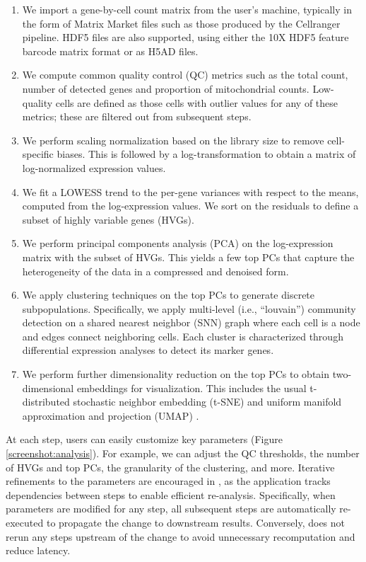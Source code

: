 \documentclass{article}
\begin{document}
\begin{enumerate}
\item We import a gene-by-cell count matrix from the user's machine, typically in the form of Matrix Market files such as those produced by the Cellranger pipeline.
HDF5 files are also supported, using either the 10X HDF5 feature barcode matrix format or as H5AD files.
\item We compute common quality control (QC) metrics such as the total count, number of detected genes and proportion of mitochondrial counts.
Low-quality cells are defined as those cells with outlier values for any of these metrics; these are filtered out from subsequent steps.
\item We perform scaling normalization based on the library size to remove cell-specific biases.
This is followed by a log-transformation to obtain a matrix of log-normalized expression values.
\item We fit a LOWESS trend \cite{cleveland1979robust} to the per-gene variances with respect to the means, computed from the log-expression values.
We sort on the residuals to define a subset of highly variable genes (HVGs). 
\item We perform principal components analysis (PCA) on the log-expression matrix with the subset of HVGs.
This yields a few top PCs that capture the heterogeneity of the data in a compressed and denoised form.
\item We apply clustering techniques on the top PCs to generate discrete subpopulations.
Specifically, we apply multi-level (i.e., ``louvain'') community detection on a shared nearest neighbor (SNN) graph where each cell is a node and edges connect neighboring cells.
Each cluster is characterized through differential expression analyses to detect its marker genes.
\item We perform further dimensionality reduction on the top PCs to obtain two-dimensional embeddings for visualization. 
This includes the usual t-distributed stochastic neighbor embedding (t-SNE) and uniform manifold approximation and projection (UMAP) \cite{maaten2014accelerating,mcinnes2018umap}.
\end{enumerate}

At each step, users can easily customize key parameters (Figure \ref{screenshot:analysis}).
For example, we can adjust the QC thresholds, the number of HVGs and top PCs, the granularity of the clustering, and more. 
Iterative refinements to the parameters are encouraged in , as the application tracks dependencies between steps to enable efficient re-analysis.
Specifically, when parameters are modified for any step, all subsequent steps are automatically re-executed to propagate the change to downstream results.
Conversely,  does not rerun any steps upstream of the change to avoid unnecessary recomputation and reduce latency.
\end{document}

